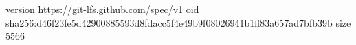 version https://git-lfs.github.com/spec/v1
oid sha256:d46f23fe5d42900885593d8fdacc5f4e49b9f08026941b1ff83a657ad7bfb39b
size 5566
